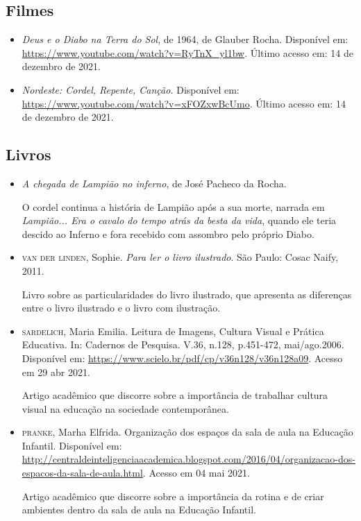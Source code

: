 \documentclass[11pt]{extarticle}
\begin{document}
\subsection{Filmes}

\begin{itemize}

	\item \textit{Deus e o Diabo na Terra do Sol}, de 1964, de Glauber Rocha. Disponível em: \url{https://www.youtube.com/watch?v=RyTnX_yl1bw}. Último acesso em: 14 de dezembro de 2021.

	\item \textit{Nordeste: Cordel, Repente, Canção.} Disponível em: \url{https://www.youtube.com/watch?v=xFOZxwBcUmo}. Último acesso em: 14 de dezembro de 2021.

\end{itemize}

\subsection{Livros}

\begin{itemize}
	\item \textit{A chegada de Lampião no inferno}, de José Pacheco da Rocha. 

O cordel continua a história de Lampião após a sua morte, narrada em \textit{Lampião... Era o cavalo do tempo atrás da besta da vida}, quando ele teria descido ao Inferno e fora recebido com assombro pelo próprio Diabo. 

	\item \textsc{van der linden}, Sophie. \textit{Para ler o livro ilustrado}. São Paulo: Cosac Naify, 2011.

Livro sobre as particularidades do livro ilustrado, que apresenta as diferenças entre o livro ilustrado e o livro com ilustração. 
\end{itemize}

\begin{itemize}
\item \textsc{sardelich}, Maria Emilia. Leitura de Imagens, Cultura Visual e Prática Educativa. 
In: Cadernos de Pesquisa. V.36, n.128, p.451-472, mai/ago.2006. Disponível em: \url{https://www.scielo.br/pdf/cp/v36n128/v36n128a09}. 
Acesso em 29 abr 2021. 

Artigo acadêmico que discorre sobre a importância de trabalhar cultura 
visual na educação na sociedade contemporânea. 

\item \textsc{pranke}, Marha Elfrida. Organização dos espaços da sala de aula na Educação Infantil. Disponível em: \url{http://centraldeinteligenciaacademica.blogspot.com/2016/04/organizacao-dos-espacos-da-sala-de-aula.html}. Acesso em 04 mai 2021. 

Artigo acadêmico que discorre sobre a importância da rotina e de criar ambientes dentro da sala de aula na Educação Infantil.  
\end{itemize}
\end{document}
